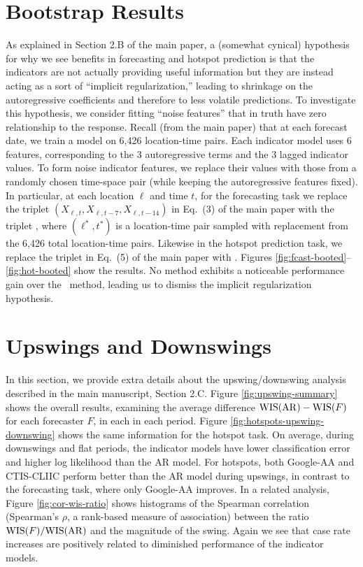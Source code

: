 \section{Bootstrap Results}

As explained in Section 2.B of the main paper, a (somewhat cynical) hypothesis
for why we see benefits in forecasting and hotspot prediction is that the
indicators are not actually providing useful information but they are instead
acting as a sort of ``implicit regularization,'' leading to shrinkage on the
autoregressive coefficients and therefore to less volatile predictions.  To
investigate this hypothesis, we consider fitting ``noise features'' that in
truth have zero relationship to the response.  Recall (from the main paper) that
at each forecast date, we train a model on 6,426 location-time pairs.  Each
indicator model uses 6 features, corresponding to the 3 autoregressive terms and
the 3 lagged indicator values.  To form noise indicator features, we replace
their values with those from a randomly chosen time-space pair (while keeping
the autoregressive features fixed).  In particular, at each location $\ell$ and
time $t$, for the forecasting task we replace the triplet $(X_{\ell,t},
X_{\ell,t-7}, X_{\ell,t-14})$ in Eq.\ (3) of the main
paper with the triplet , where $(\ell^*,t^*)$ is a location-time pair sampled with
replacement from the 6,426 total location-time pairs.  Likewise in the hotspot 
prediction task, we replace the triplet  in Eq.\ (5) of the main paper with
.  Figures
\ref{fig:fcast-booted}--\ref{fig:hot-booted} show the results.  No method
exhibits a noticeable performance gain over the \ar~method, leading us to
dismiss the implicit regularization hypothesis. 

\section{Upswings and Downswings}

In this section, we provide extra details about the upswing/downswing analysis
described in the main manuscript, Section 2.C. Figure \ref{fig:upswing-summary}
shows the overall results, examining the average difference $\mathrm{WIS}(\mathrm{AR}) - 
\mathrm{WIS}(F)$ for each forecaster $F$, in each in each period.  Figure
\ref{fig:hotspots-upswing-downswing} shows the same information for the hotspot 
task.  On average, during downswings and flat periods, the indicator models have
lower classification error and higher log likelihood than the AR model.  For
hotspots, both Google-AA and CTIS-CLIIC perform better than the AR model during
upswings, in contrast to the forecasting task, where only Google-AA improves.
In a related analysis, Figure \ref{fig:cor-wis-ratio} shows histograms of the
Spearman correlation (Spearman's $\rho$, a rank-based measure of association)
between the ratio $\mathrm{WIS}(F)/\mathrm{WIS}(\mathrm{AR})$ and the magnitude of the swing.
Again we see that case rate increases are positively related to diminished
performance of the indicator models.

